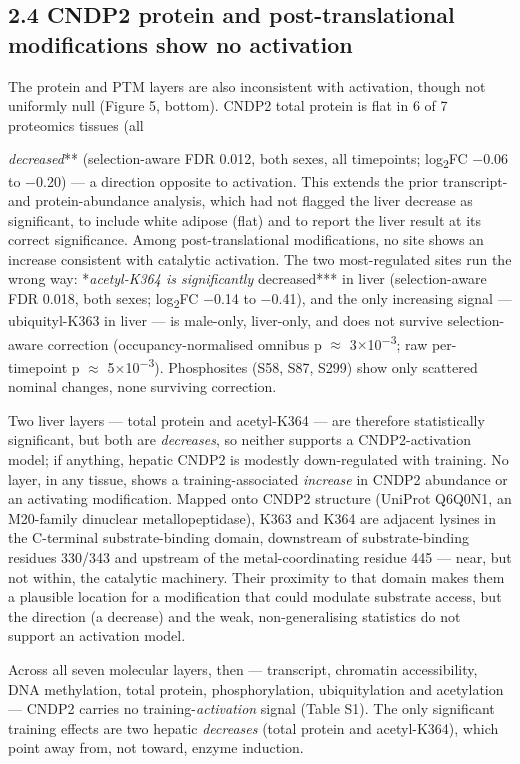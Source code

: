 \documentclass[11pt]{article}
\begin{document}
\subsection*{2.4 CNDP2 protein and post-translational modifications show no activation}

The protein and PTM layers are also inconsistent with activation, though not uniformly
null (Figure 5, bottom). CNDP2 total protein is flat in 6 of 7 proteomics tissues (all

\textit{decreased}** (selection-aware FDR 0.012, both sexes, all timepoints; log\textsubscript{2}FC $-$0.06 to
$-$0.20) --- a direction opposite to activation. This extends the prior transcript- and
protein-abundance analysis, which had not flagged the liver decrease as significant, to
include white adipose (flat) and to report the liver result at its correct
significance. Among post-translational modifications, no site shows an increase
consistent with catalytic activation. The two most-regulated sites run the wrong way:
*\textit{acetyl-K364 is significantly }decreased*** in liver (selection-aware FDR 0.018, both
sexes; log\textsubscript{2}FC $-$0.14 to $-$0.41), and the only increasing signal --- ubiquityl-K363 in liver
--- is male-only, liver-only, and does not survive selection-aware correction (occupancy-normalised omnibus
p $\approx$ 3$\times$10\textsuperscript{$-$}\textsuperscript{3}; raw per-timepoint p $\approx$ 5$\times$10\textsuperscript{$-$}\textsuperscript{3}). Phosphosites (S58, S87, S299) show only scattered nominal changes, none
surviving correction.

Two liver layers --- total protein and acetyl-K364 --- are therefore statistically
significant, but both are \textit{decreases}, so neither supports a CNDP2-activation model; if
anything, hepatic CNDP2 is modestly down-regulated with training. No layer, in any
tissue, shows a training-associated \textit{increase} in CNDP2 abundance or an activating
modification.
Mapped onto CNDP2 structure (UniProt Q6Q0N1, an M20-family dinuclear metallopeptidase),
K363 and K364 are adjacent lysines in the C-terminal substrate-binding domain,
downstream of substrate-binding residues 330/343 and upstream of the metal-coordinating
residue 445 --- near, but not within, the catalytic machinery. Their proximity to that
domain makes them a plausible location for a modification that could modulate substrate
access, but the direction (a decrease) and the weak, non-generalising statistics do not
support an activation model.

Across all seven molecular layers, then --- transcript, chromatin accessibility, DNA
methylation, total protein, phosphorylation, ubiquitylation and acetylation --- CNDP2
carries no training-\textit{activation} signal (Table S1). The only significant training
effects are two hepatic \textit{decreases} (total protein and acetyl-K364), which point away
from, not toward, enzyme induction.
\end{document}
